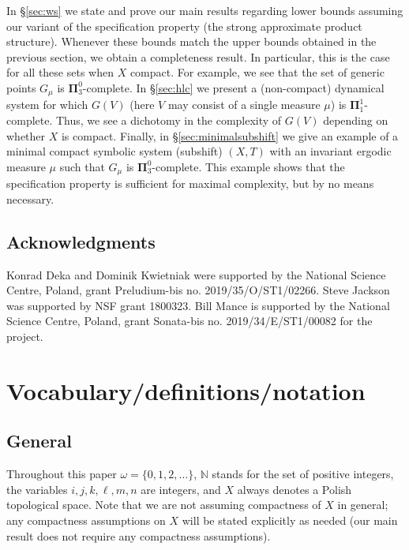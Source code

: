\documentclass{amsart}
\theoremstyle{definition}
\newcommand{\bp}{\boldsymbol{\Pi}}
\newcommand{\bP}{\boldsymbol{\Pi}}
\newcommand{\N}{\mathbb{N}}
\begin{document}
In \S\ref{sec:ws} we state and prove our main results regarding lower bounds assuming our variant of the specification property (the strong approximate product structure).
Whenever these bounds match the upper bounds obtained in the previous section, we obtain a completeness result.
In particular, this is the case for all these sets when $X$ compact.
For example, we see that the set of generic points $G_\mu$  is $\bp^0_3$-complete. %
In \S\ref{sec:hlc} we present a (non-compact) dynamical system for which $G(V)$ (here
$V$ may consist of a single measure $\mu$) is $\bp^1_1$-complete.
Thus, we see a dichotomy in the complexity of $G(V)$ depending on whether $X$ is
compact. Finally, in \S\ref{sec:minimalsubshift} we give an example of a minimal compact symbolic system (subshift) $(X, T)$ with an invariant ergodic measure $\mu$ such that $G_\mu$ is $\bP_3^0$-complete. This example shows that the specification property is sufficient for maximal complexity, but by no means necessary.



\subsection*{Acknowledgments}

Konrad Deka and Dominik Kwietniak were supported by the National Science
Centre, Poland, grant Preludium-bis no. 2019/35/O/ST1/02266. Steve Jackson was supported by NSF grant 1800323. Bill Mance is supported by the National Science Centre, Poland, grant Sonata-bis no.  2019/34/E/ST1/00082 for the project.












\section{Vocabulary/definitions/notation} \label{sec:voc}
\subsection{General} Throughout this paper $\omega=\{0,1,2,\ldots\}$, $\N$ stands for the set of positive integers,
the variables $i,j,k,\ell,m,n$ are integers, and
$X$ always denotes a Polish topological space.
Note that we are not assuming compactness
of $X$ in general; any compactness assumptions on $X$ will be stated explicitly
as needed (our main result does not require any compactness assumptions).
\end{document}
